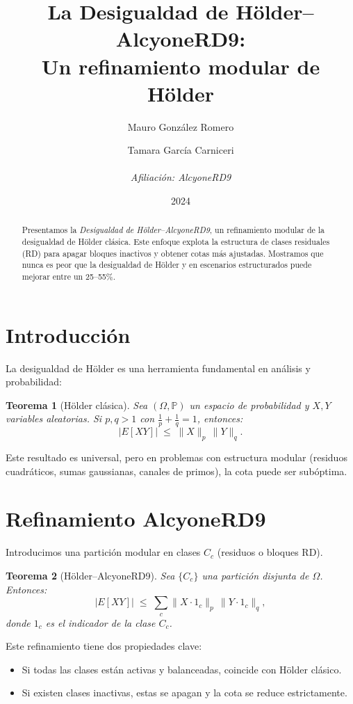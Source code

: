 \documentclass[12pt,a4paper]{article}
\title{\textbf{La Desigualdad de Hölder–AlcyoneRD9: \\ Un refinamiento modular de Hölder}}
\author{
  Mauro González Romero \and Tamara García Carniceri \\
  \\
  \textit{Afiliación: AlcyoneRD9}
}
\date{2024}
\theoremstyle{plain}
\newtheorem{theorem}{Teorema}
\begin{document}
\maketitle

\begin{abstract}
Presentamos la \emph{Desigualdad de Hölder–AlcyoneRD9}, un refinamiento modular de la desigualdad de Hölder clásica. 
Este enfoque explota la estructura de clases residuales (RD) para apagar bloques inactivos y obtener cotas más ajustadas.
Mostramos que nunca es peor que la desigualdad de Hölder y en escenarios estructurados puede mejorar entre un 25--55\%.
\end{abstract}

\section{Introducción}
La desigualdad de Hölder es una herramienta fundamental en análisis y probabilidad:

\begin{theorem}[Hölder clásica]
Sea $(\Omega,\mathbb{P})$ un espacio de probabilidad y $X,Y$ variables aleatorias. 
Si $p,q>1$ con $\tfrac{1}{p}+\tfrac{1}{q}=1$, entonces:
\[
|E[XY]| \;\leq\; \|X\|_p \, \|Y\|_q.
\]
\end{theorem}

Este resultado es universal, pero en problemas con estructura modular (residuos cuadráticos, sumas gaussianas, canales de primos), la cota puede ser subóptima.

\section{Refinamiento AlcyoneRD9}
Introducimos una partición modular en clases $C_c$ (residuos o bloques RD). 

\begin{theorem}[Hölder–AlcyoneRD9]
Sea $\{C_c\}$ una partición disjunta de $\Omega$. Entonces:
\[
|E[XY]| \;\leq\; \sum_{c} \|X \cdot 1_c\|_p \, \|Y \cdot 1_c\|_q,
\]
donde $1_c$ es el indicador de la clase $C_c$.
\end{theorem}

Este refinamiento tiene dos propiedades clave:
\begin{itemize}
    \item Si todas las clases están activas y balanceadas, coincide con Hölder clásico.
    \item Si existen clases inactivas, estas se apagan y la cota se reduce estrictamente.
\end{itemize}
\end{document}
